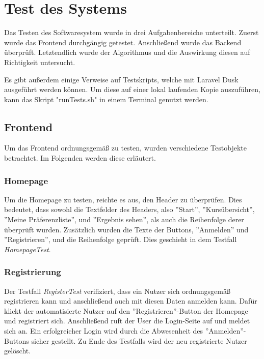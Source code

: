 \chapter{Test des Systems}
\label{chapter:testing}

	Das Testen des Softwaresystem wurde in drei Aufgabenbereiche unterteilt.
	Zuerst wurde das Frontend durchgängig getestet.
	Anschließend wurde das Backend überprüft.
	Letztendlich wurde der Algorithmus und die Auswirkung diesen auf Richtigkeit untersucht.\newline
	
	Es gibt außerdem einige Verweise auf Testskripts, welche mit Laravel Dusk ausgeführt werden können.
	Um diese auf einer lokal laufenden Kopie auszuführen, kann das Skript "runTests.sh" in einem Terminal genutzt werden.\newline
	
	\section{Frontend}
		Um das Frontend ordnungsgemäß zu testen, wurden verschiedene Testobjekte betrachtet.
		Im Folgenden werden diese erläutert.
		
		\subsection{Homepage}
			Um die Homepage zu testen, reichte es aus, den Header zu überprüfen.
			Dies bedeutet, dass sowohl die Textfelder des Headers, also ''Start'', ''Kursübersicht'', ''Meine Präferenzliste'', und ''Ergebnis sehen'', als auch die Reihenfolge derer überprüft wurden.
			Zusätzlich wurden die Texte der Buttons, ''Anmelden'' und ''Registrieren'', und die Reihenfolge geprüft.
			Dies geschieht in dem Testfall \textit{HomepageTest}.\newline
		
		\subsection{Registrierung}
			Der Testfall \textit{RegisterTest} verifiziert, dass ein Nutzer sich ordnungsgemäß registrieren kann und anschließend auch mit diesen Daten anmelden kann.
			Dafür klickt der automatisierte Nutzer auf den ''Registrieren''-Button der Homepage und registriert sich.
			Anschließend ruft der User die Login-Seite auf und meldet sich an.
			Ein erfolgreicher Login wird durch die Abwesenheit des ''Anmelden''-Buttons sicher gestellt.
			Zu Ende des Testfalls wird der neu registrierte Nutzer gelöscht.\newline
		
